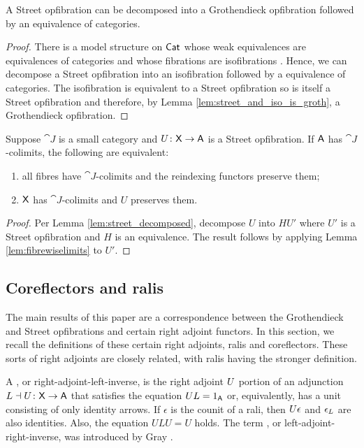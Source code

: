 \documentclass{amsart}
\begin{document}
\begin{lem} \label{lem:street_decomposed} A Street opfibration can be
  decomposed into a Grothendieck opfibration followed by an
  equivalence of categories.
\end{lem}

\begin{proof}
  There is a model structure on $\mathsf{Cat}$ whose weak equivalences are
  equivalences of categories and whose fibrations are isofibrations
  \cite{rezk}. Hence, we can decompose a Street opfibration into an
  isofibration followed by a equivalence of categories. The
  isofibration is equivalent to a Street opfibration so is itself a
  Street opfibration and therefore, by Lemma
  \ref{lem:street_and_iso_is_groth}, a Grothendieck opfibration.
\end{proof}

\begin{lem} \label{lem:street-fibrewise-limits}
  Suppose $ \cat{J} $ is a small category and $ U \colon \mathsf{X}
  \to \mathsf{A} $ is a Street opfibration. If $ \mathsf{A} $ has $ \cat{J}
  $-colimits, the following are equivalent:
  \begin{enumerate}
  \item
    all fibres have $ \cat{J} $-colimits and the
    reindexing functors preserve them;
  \item
    $ \mathsf{X} $ has $ \cat{J} $-colimits and $ U $ preserves
    them.
  \end{enumerate}
\end{lem}

\begin{proof}
  Per Lemma \ref{lem:street_decomposed}, decompose $U$ into $H U'$
  where $U'$ is a Street opfibration and $H$ is an equivalence. The
  result follows by applying Lemma \ref{lem:fibrewiselimits} to $U'$.
\end{proof}

\subsection{Coreflectors and ralis}

The main results of this paper are a correspondence between the
Grothendieck and Street opfibrations and certain right adjoint
functors. In this section, we recall the definitions of these certain
right adjoints, ralis and coreflectors. These sorts of right adjoints
are closely related, with ralis having the stronger definition.

A , or right-adjoint-left-inverse, is the right adjoint
$U$ portion of an adjunction $L\dashv U\colon\mathsf{X}\to\mathsf{A}$ that satisfies
the equation $UL=1_{\mathsf{A}}$ or, equivalently, has a unit consisting of
only identity arrows. If $\epsilon$ is the counit of a rali, then
$U\epsilon$ and $\epsilon_L$ are also identities. Also, the equation
$ULU=U$ holds. The term , or left-adjoint-right-inverse,
was introduced by Gray \cite{Grayfibredandcofibred}.
\end{document}

